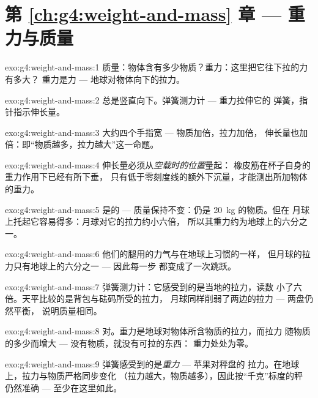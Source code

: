 \section*{第 \ref{ch:g4:weight-and-mass} 章 --- 重力与质量}

\begin{solution}{exo:g4:weight-and-mass:1}
质量：物体含有多少物质？重力：这里把它往下拉的力有多大？
重力是力 --- 地球对物体向下的拉力。
\end{solution}

\begin{solution}{exo:g4:weight-and-mass:2}
总是竖直向下。弹簧测力计 --- 重力拉伸它的
弹簧，指针指示伸长量。
\end{solution}

\begin{solution}{exo:g4:weight-and-mass:3}
大约四个手指宽 --- 物质加倍，拉力加倍，
伸长量也加倍：即“物质越多，拉力越大”这一命题。
\end{solution}

\begin{solution}{exo:g4:weight-and-mass:4}
伸长量必须从\emph{空载时的位置}量起：
橡皮筋在杯子自身的重力作用下已经有所下垂，
只有低于零刻度线的额外下沉量，才能测出所加物体的重力。
\end{solution}

\begin{solution}{exo:g4:weight-and-mass:5}
是的 --- 质量保持不变：仍是 \qty{20}{kg} 的物质。但在
月球上托起它容易得多：月球对它的拉力约小六倍，
所以其重力约为地球上的六分之一。
\end{solution}

\begin{solution}{exo:g4:weight-and-mass:6}
他们的腿用的力气与在地球上习惯的一样，
但月球的拉力只有地球上的六分之一 --- 因此每一步
都变成了一次跳跃。
\end{solution}

\begin{solution}{exo:g4:weight-and-mass:7}
弹簧测力计：它感受到的是当地的拉力，读数
小了六倍。天平比较的是背包与砝码所受的拉力，
月球同样削弱了两边的拉力 --- 两盘仍然平衡，
说明质量相同。
\end{solution}

\begin{solution}{exo:g4:weight-and-mass:8}
对。重力是地球对物体所含物质的拉力，而拉力
随物质的多少而增大 --- 没有物质，就没有可拉的东西：
重力处处为零。
\end{solution}

\begin{solution}{exo:g4:weight-and-mass:9}
弹簧感受到的是\emph{重力} --- 苹果对秤盘的
拉力。在地球上，拉力与物质严格同步变化
（拉力越大，物质越多），因此按“千克”标度的秤
仍然准确 --- 至少在这里如此。
\end{solution}

